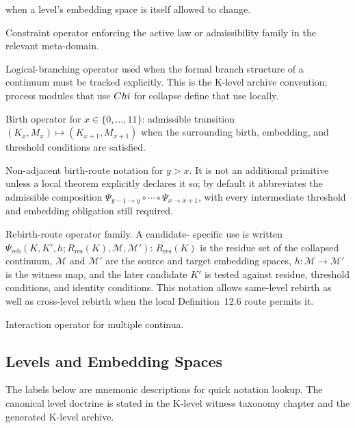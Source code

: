 \begin{description}
        when a level's embedding space is itself allowed to change.
  \item[\(\Lambda\)] Constraint operator enforcing the active law or
        admissibility family in the relevant meta-domain.
  \item[\(\Chi\)] Logical-branching operator used when the formal branch
        structure of a continuum must be tracked explicitly. This is the
        K-level archive convention; process modules that use \(\Chi\) for
        collapse define that use locally.
  \item[\(\Psi_{x\to x+1}\)] Birth operator for \(x\in\{0,\dots,11\}\):
        admissible transition \((K_x,M_x)\mapsto (K_{x+1},M_{x+1})\) when
        the surrounding birth, embedding, and threshold conditions are
        satisfied.
  \item[\(\Psi_{x\to y}\)] Non-adjacent birth-route notation for \(y>x\). It is
        not an additional primitive unless a local theorem explicitly declares
        it so; by default it abbreviates the admissible composition
        \(\Psi_{y-1\to y}\circ\cdots\circ\Psi_{x\to x+1}\), with every
        intermediate threshold and embedding obligation still required.
  \item[\(\Psi_{\mathrm{reb}}\)] Rebirth-route operator family. A candidate-
        specific use is written
        \(\Psi_{\mathrm{reb}}(K,K',h;R_{\mathrm{res}}(K),\mathcal{M},\mathcal{M}')\):
        \(R_{\mathrm{res}}(K)\) is the residue set of the collapsed continuum,
        \(\mathcal{M}\) and \(\mathcal{M}'\) are the source and target
        embedding spaces, \(h:\mathcal{M}\to\mathcal{M}'\) is the witness map,
        and the later candidate \(K'\) is tested against residue, threshold
        conditions, and identity conditions. This notation allows same-level
        rebirth as well as cross-level rebirth when the local Definition~12.6
        route permits it.
  \item[\(E_{\mathrm{int}}\)] Interaction operator for multiple continua.
\end{description}

\subsection{Levels and Embedding Spaces}

The labels below are mnemonic descriptions for quick notation lookup. The
canonical level doctrine is stated in the K-level witness taxonomy chapter and the
generated K-level archive.


